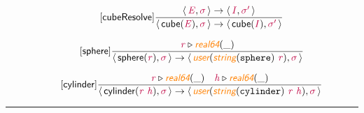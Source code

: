 \documentclass[10pt,leqno,fleqn]{article}
\newcommand{\artVariable}[1]{\mbox{\color{purple}\em #1\/}}
\newcommand{\artConstructor}[1]{\mbox{\sf #1}}
\newcommand{\artCaseInsensitiveLiteral}[1]{\mbox{\tt #1}}
\newcommand{\artSpecial}[1]{\mbox{\color{orange}\sf\em #1}}
\begin{document}
\begin{equation}
\tag*{[\artConstructor{\sf cubeResolve}]}
\begin{split}\frac{\langle\, \artVariable{E}, \artVariable{$\sigma$}\,\rangle \rightarrow \langle\, \artVariable{I}, \artVariable{$\sigma$\/$^\prime$}\,\rangle }{\langle\, \artConstructor{\sf cube}(\artVariable{E}), \artVariable{$\sigma$}\,\rangle \rightarrow \langle\, \artConstructor{\sf cube}(\artVariable{I}), \artVariable{$\sigma$\/$^\prime$}\,\rangle }
\end{split}
\end{equation}

\begin{equation}
\tag*{[\artConstructor{\sf sphere}]}
\begin{split}\frac{ \artVariable{r}\triangleright \artSpecial{real64}(\_) }{\langle\, \artConstructor{\sf sphere}(\artVariable{r}), \artVariable{$\sigma$}\,\rangle \rightarrow \langle\, \artSpecial{user}(\artSpecial{string}(\artCaseInsensitiveLiteral{sphere})\ \artVariable{r}), \artVariable{$\sigma$}\,\rangle }
\end{split}
\end{equation}

\begin{equation}
\tag*{[\artConstructor{\sf cylinder}]}
\begin{split}\frac{ \artVariable{r}\triangleright \artSpecial{real64}(\_) \quad  \artVariable{h}\triangleright \artSpecial{real64}(\_) }{\langle\, \artConstructor{\sf cylinder}(\artVariable{r}\ \artVariable{h}), \artVariable{$\sigma$}\,\rangle \rightarrow \langle\, \artSpecial{user}(\artSpecial{string}(\artCaseInsensitiveLiteral{cylinder})\ \artVariable{r}\ \artVariable{h}), \artVariable{$\sigma$}\,\rangle }
\end{split}
\end{equation}

\hrule
\end{document}
